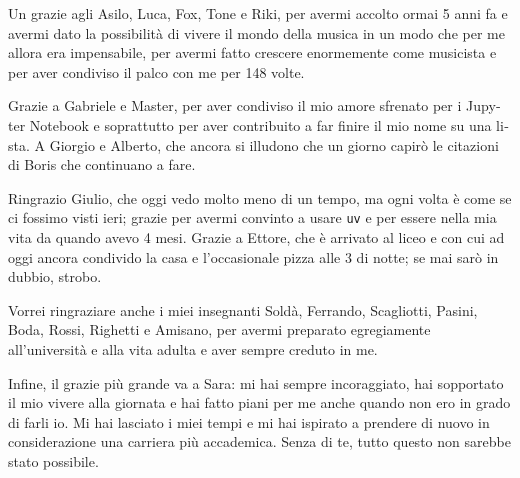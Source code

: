 \begin{otherlanguage}{italian}
    Un grazie agli Asilo, Luca, Fox, Tone e Riki, per avermi accolto ormai 5
    anni fa e avermi dato la possibilit\`a di vivere il mondo della musica in un
    modo che per me allora era impensabile, per avermi fatto crescere
    enormemente come musicista e per aver condiviso il palco con me per 148
    volte.

    Grazie a Gabriele e Master, per aver condiviso il mio amore sfrenato per i
    Jupyter Notebook e soprattutto per aver contribuito a far finire il mio nome
    su una lista. A Giorgio e Alberto, che ancora si illudono che un giorno
    capir\`o le citazioni di Boris che continuano a fare.

    Ringrazio Giulio, che oggi vedo molto meno di un tempo, ma ogni volta \`e
    come se ci fossimo visti ieri; grazie per avermi convinto a usare
    \texttt{uv} e per essere nella mia vita da quando avevo 4 mesi. Grazie a
    Ettore, che \`e arrivato al liceo e con cui ad oggi ancora condivido la casa
    e l'occasionale pizza alle 3 di notte; se mai sar\`o in dubbio, strobo.

    Vorrei ringraziare anche i miei insegnanti Sold\`a, Ferrando, Scagliotti,
    Pasini, Boda, Rossi, Righetti e Amisano, per avermi preparato egregiamente
    all'universit\`a e alla vita adulta e aver sempre creduto in me.

    Infine, il grazie pi\`u grande va a Sara: mi hai sempre incoraggiato, hai
    sopportato il mio vivere alla giornata e hai fatto piani per me anche quando
    non ero in grado di farli io. Mi hai lasciato i miei tempi e mi hai ispirato
    a prendere di nuovo in considerazione una carriera pi\`u accademica. Senza
    di te, tutto questo non sarebbe stato possibile.


\endgroup
\end{otherlanguage}
